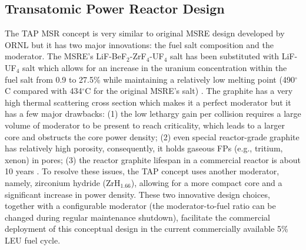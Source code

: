 \documentclass{anstrans}
\begin{document}
\subsection{Transatomic Power Reactor Design}
The \gls{TAP} \gls{MSR} concept is very similar to original \gls{MSRE} design 
developed by \gls{ORNL} \cite{haubenreich_experience_1970} but it has two 
major innovations: 
the fuel salt composition and the moderator. The \gls{MSRE}'s  
LiF-BeF$_2$-ZrF$_4$-UF$_4$ salt has been substituted with LiF-UF$_4$ salt 
which allows for an increase in the uranium concentration within the fuel salt 
from 0.9 to 27.5\% while maintaining a relatively low melting point 
(490$^{\circ}$C compared with 434$^{\circ}$C for the original \gls{MSRE}'s 
salt) \cite{betzler_assessment_2017}. The graphite has a very high 
thermal scattering cross section which makes it a perfect moderator but it has 
a few major drawbacks: 
(1) the low lethargy gain per collision requires a large volume of moderator 
to be present to reach criticality, which leads to a larger core and obstructs 
the core power density; (2) even special 
reactor-grade graphite has relatively high porosity, consequently, it holds
gaseous \glspl{FP} 
(e.g., tritium, xenon) in pores; (3) the reactor graphite lifespan in a 
commercial 
reactor is about 10 years \cite{robertson_conceptual_1971}. To resolve these 
issues, the \gls{TAP} concept uses another 
moderator, namely, zirconium hydride (ZrH$_{1.66}$), allowing for a more 
compact core and a 
significant increase in power density. These two innovative design choices,  
together with a configurable moderator 
(the moderator-to-fuel ratio can be changed during regular maintenance 
shutdown), 
facilitate the commercial deployment of this conceptual design in the current 
commercially available 5\% \gls{LEU} fuel cycle. 
\end{document}
